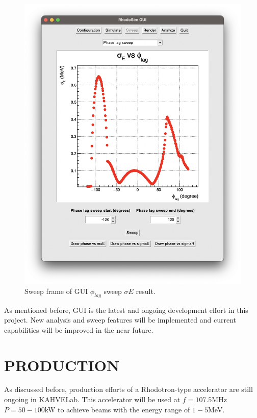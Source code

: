 \documentclass[a4paper,oneside,12pt]{report}
\numberwithin{equation}{chapter}
\begin{document}
{\begin{figure}[h]
    \includegraphics[width=0.85\linewidth]{./figures/rhodoSim/GUI_sweep_sE_3.png}
    \vspace{-20pt}
    \caption{Sweep frame of GUI $\phi_{lag}$ sweep $\sigma E$ result.}
    \label{fig:gui_sweep_sE}
    \vspace{10pt}
\end{figure}

As mentioned before, GUI is the latest and ongoing development effort in this project.
New analysis and sweep features will be implemented and current capabilities will be improved in the near future.



\newpage


\chapter{PRODUCTION}

As discussed before, production efforts of a Rhodotron-type accelerator are still ongoing in KAHVELab.
This accelerator will be used at $f=107.5$MHz $P=50-100$kW to achieve beams with the energy range of $1-5$MeV.
}
\end{document}
